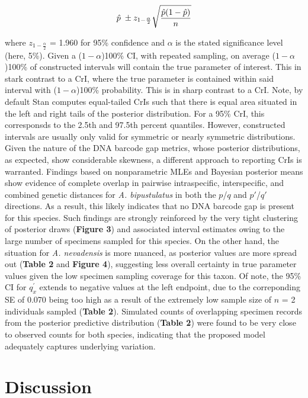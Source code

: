 \documentclass[12pt]{article}
\begin{document}
\begin{equation}
\hat{p} \hspace{1mm} \pm z_{1 - \frac{\alpha}{2}}\sqrt{\frac{\hat{p}(1 - \hat{p})}{n}}
\end{equation}

\noindent where $z_{1 - \frac{\alpha}{2}}$ = 1.960 for 95\% confidence and $\alpha$ is the stated significance level (here, 5\%). Given a ($1 - \alpha$)100\% CI, with repeated sampling, on average ($1 - \alpha$)100\% of constructed intervals will contain the true parameter of interest. This in stark contrast to a CrI, where the true parameter is contained within said interval with ($1 - \alpha$)100\% probability. This is in sharp contrast to a CrI. Note, by default Stan computes equal-tailed CrIs such that there is equal area situated in the left and right tails of the posterior distribution. For a 95\% CrI, this corresponsds to the 2.5th and 97.5th percent quantiles. However, constructed intervals are usually only valid for symmetric or nearly symmetric distributions. Given the nature of the DNA barcode gap metrics, whose posterior distributions, as expected, show considerable skewness, a different approach to reporting CrIs is warranted. Findings based on nonparametric MLEs and Bayesian posterior means show evidence of complete overlap in pairwise intraspecific, interspecific, and combined genetic distances for \textit{A. bipustulatus} in both the $p$/$q$ and $p'$/$q'$ directions. As a result, this likely indicates that no DNA barcode gap is present for this species. Such findings are strongly reinforced by the very tight clustering of posterior draws (\textbf{Figure 3}) and associated interval estimates owing to the large number of specimens sampled for this species. On the other hand, the situation for \textit{A. nevadensis} is more nuanced, as posterior values are more spread out (\textbf{Table 2} and \textbf{Figure 4}), suggesting less overall certainty in true parameter values given the low specimen sampling coverage for this taxon. Of note, the 95\% CI for $q^{'}_x$ extends to negative values at the left endpoint, due to the correponding SE of 0.070 being too high as a result of the extremely low sample size of $n$ = 2 individuals sampled (\textbf{Table 2}). Simulated counts of overlapping specimen records from the posterior predictive distribution (\textbf{Table 2}) were found to be very close to observed counts for both species, indicating that the proposed model adequately captures underlying variation. 

\section{Discussion}
\end{document}
